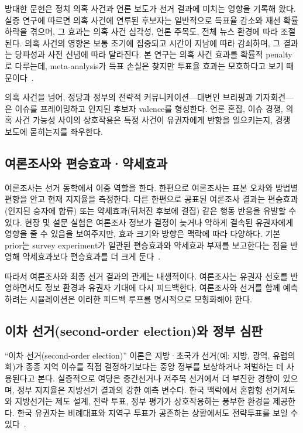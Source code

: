 \documentclass[11pt]{article}
\begin{document}
방대한 문헌은 정치 의혹 사건과 언론 보도가 선거 결과에 미치는 영향을 기록해 왔다. 실증 연구에 따르면 의혹 사건에 연루된 후보자는 일반적으로 득표율 감소와 재선 확률 하락을 겪으며, 그 효과는 의혹 사건 심각성, 언론 주목도, 전체 뉴스 환경에 따라 조절된다. 의혹 사건의 영향은 보통 초기에 집중되고 시간이 지남에 따라 감쇠하며, 그 결과는 당파성과 사전 신념에 따라 달라진다. 본 연구는 의혹 사건 효과를 확률적 penalty로 다루는데, meta-analysis가 득표 손실은 찾지만 투표율 효과는 모호하다고 보기 때문이다~\cite{solaz2018scandalmeta}.

의혹 사건을 넘어, 정당과 정부의 전략적 커뮤니케이션---대변인 브리핑과 기자회견---은 이슈를 프레이밍하고 인지된 후보자 valence를 형성한다. 언론 혼잡, 이슈 경쟁, 의혹 사건 가능성 사이의 상호작용은 특정 사건이 유권자에게 반향을 일으키는지, 경쟁 보도에 묻히는지를 좌우한다.

\subsection{여론조사와 편승효과·약세효과}

여론조사는 선거 동학에서 이중 역할을 한다. 한편으로 여론조사는 표본 오차와 방법별 편향을 안고 현재 지지율을 측정한다. 다른 한편으로 공표된 여론조사 결과는 편승효과(인지된 승자에 합류) 또는 약세효과(뒤처진 후보에 결집) 같은 행동 반응을 유발할 수 있다. 현장 및 설문 실험은 여론조사 정보가 결정이 늦거나 약하게 결속된 유권자에게 영향을 줄 수 있음을 보여주지만, 효과 크기와 방향은 맥락에 따라 다양하다. 기본 prior는 survey experiment가 일관된 편승효과와 약세효과 부재를 보고한다는 점을 반영해 약세효과보다 편승효과를 더 크게 둔다~\cite{hansen2016polls}.

따라서 여론조사와 최종 선거 결과의 관계는 내생적이다. 여론조사는 유권자 선호를 반영하면서도 정보 환경과 유권자 기대에 다시 피드백한다. 여론조사와 선거를 함께 예측하려는 시뮬레이션은 이러한 피드백 루프를 명시적으로 모형화해야 한다.

\subsection{이차 선거(second-order election)와 정부 심판}

``이차 선거(second-order election)'' 이론은 지방·초국가 선거(예: 지방, 광역, 유럽의회)가 종종 지역 이슈를 직접 결정하기보다는 중앙 정부를 보상하거나 처벌하는 데 사용된다고 본다. 실증적으로 여당은 중간선거나 저주목 선거에서 더 부진한 경향이 있으며, 정부 지지율은 지방선거 결과의 강한 예측 변수다. 한국 맥락에서 혼합형 선거제도와 지방선거는 제도 설계, 전략 투표, 정부 평가가 상호작용하는 풍부한 환경을 제공한다. 한국 유권자는 비례대표와 지역구 투표가 공존하는 상황에서도 전략투표를 보일 수 있다~\cite{choi2006strategic}.
\end{document}
